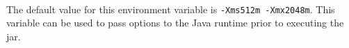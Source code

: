 
\noindent\\The default value for this environment variable is \texttt{-Xms512m -Xmx2048m}.  This variable can 
be used to pass options to the Java runtime prior to executing the \cxflow jar.

